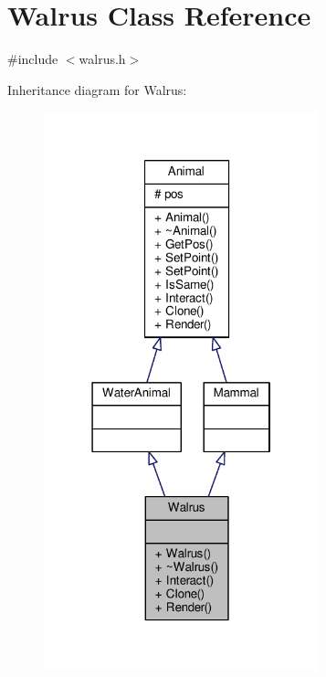 \hypertarget{classWalrus}{}\section{Walrus Class Reference}
\label{classWalrus}


{\ttfamily \#include $<$walrus.\+h$>$}



Inheritance diagram for Walrus\+:
\nopagebreak
\begin{figure}[H]
\begin{center}
\leavevmode
\includegraphics[width=226pt]{classWalrus__inherit__graph}
\end{center}
\end{figure}


